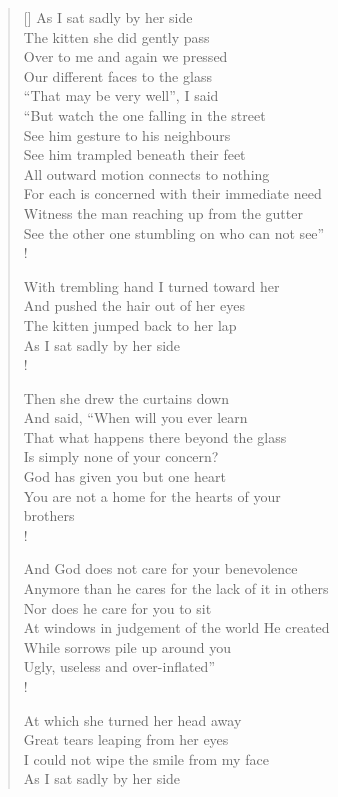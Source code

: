 \documentclass[11pt, a4paper]{article} %
\begin{document}
\begin{verse}[\versewidth]
As I sat sadly by her side \\
The kitten she did gently pass \\
Over to me and again we pressed \\
Our different faces to the glass \\
“That may be very well”, I said \\
“But watch the one falling in the street \\
See him gesture to his neighbours \\
See him trampled beneath their feet \\
All outward motion connects to nothing \\
For each is concerned with their immediate need \\
Witness the man reaching up from the gutter \\
See the other one stumbling on who can not see” \\!

With trembling hand I turned toward her \\
And pushed the hair out of her eyes \\
The kitten jumped back to her lap \\
As I sat sadly by her side \\!

Then she drew the curtains down \\
And said, “When will you ever learn \\
That what happens there beyond the glass \\
Is simply none of your concern? \\
God has given you but one heart \\
You are not a home for the hearts of your \\
brothers \\!

And God does not care for your benevolence \\
Anymore than he cares for the lack of it in others \\
Nor does he care for you to sit \\
At windows in judgement of the world He created \\
While sorrows pile up around you \\
Ugly, useless and over-inflated” \\!

At which she turned her head away \\
Great tears leaping from her eyes \\
I could not wipe the smile from my face \\
As I sat sadly by her side \\

\end{verse}
\end{document}
